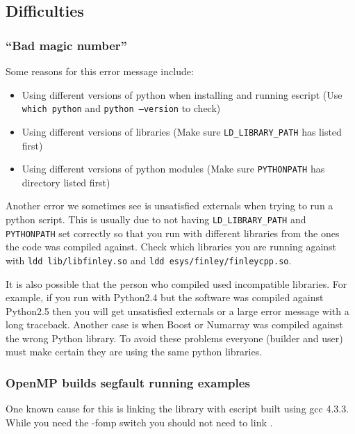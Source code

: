 \subsection{Difficulties}

\subsubsection{``Bad magic number''}
Some reasons for this error message include:
\begin{itemize}
 \item Using different versions of python when installing and running escript (Use \texttt{which python} and \texttt{python --version} to check)
\item Using different versions of libraries (Make sure \texttt{LD_LIBRARY_PATH} has  listed first)
\item Using different versions of python modules (Make sure \texttt{PYTHONPATH} has  directory listed first) 
\end{itemize}

Another error we sometimes see is unsatisfied externals when trying to run a python script. This is usually due to not having \texttt{LD_LIBRARY_PATH} and \texttt{PYTHONPATH} set correctly so that you run with different libraries from the ones the code was compiled against. Check which libraries you are running against with \texttt{ldd lib/libfinley.so} and \texttt{ldd esys/finley/finleycpp.so}.

It is also possible that the person who compiled \esfinley used incompatible libraries. For example, if you run with Python2.4 but the software was compiled against Python2.5 then you will get unsatisfied externals or a large error message with a long traceback. Another case is when Boost or Numarray was compiled against the wrong Python library. To avoid these problems everyone (builder and user) must make certain they are using the same python libraries. 

\subsubsection{OpenMP builds segfault running examples}

One known cause for this is linking the  library with escript built using gcc 4.3.3.
While you need the -fomp switch you should not need to link .
